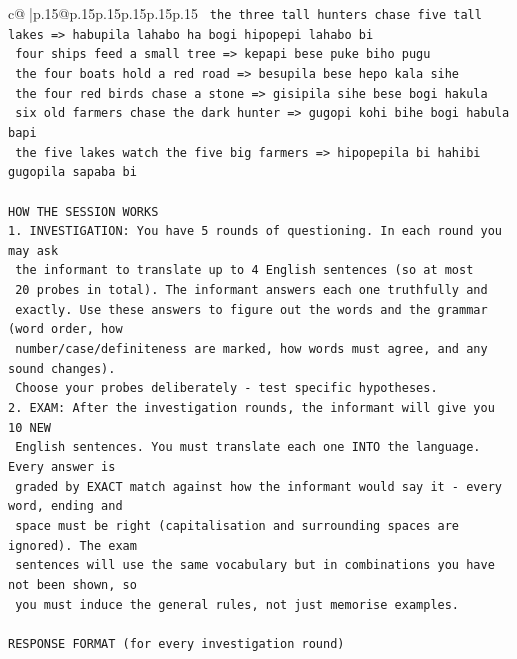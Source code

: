\documentclass{article}
\begin{document}
{\begin{supertabular}{c@{$\;$}|p{.15\linewidth}@{}p{.15\linewidth}p{.15\linewidth}p{.15\linewidth}p{.15\linewidth}p{.15\linewidth}}
{{{\texttt{    the three tall hunters chase five tall lakes  =>  habupila lahabo ha bogi hipopepi lahabo bi} \\
\texttt{    four ships feed a small tree  =>  kepapi bese puke biho pugu} \\
\texttt{    the four boats hold a red road  =>  besupila bese hepo kala sihe} \\
\texttt{    the four red birds chase a stone  =>  gisipila sihe bese bogi hakula} \\
\texttt{    six old farmers chase the dark hunter  =>  gugopi kohi bihe bogi habula bapi} \\
\texttt{    the five lakes watch the five big farmers  =>  hipopepila bi hahibi gugopila sapaba bi} \\
\\ 
\texttt{HOW THE SESSION WORKS} \\
\texttt{1. INVESTIGATION: You have 5 rounds of questioning. In each round you may ask} \\
\texttt{   the informant to translate up to 4 English sentences (so at most} \\
\texttt{   20 probes in total). The informant answers each one truthfully and} \\
\texttt{   exactly. Use these answers to figure out the words and the grammar (word order, how} \\
\texttt{   number/case/definiteness are marked, how words must agree, and any sound changes).} \\
\texttt{   Choose your probes deliberately {-} test specific hypotheses.} \\
\texttt{2. EXAM: After the investigation rounds, the informant will give you 10 NEW} \\
\texttt{   English sentences. You must translate each one INTO the language. Every answer is} \\
\texttt{   graded by EXACT match against how the informant would say it {-} every word, ending and} \\
\texttt{   space must be right (capitalisation and surrounding spaces are ignored). The exam} \\
\texttt{   sentences will use the same vocabulary but in combinations you have not been shown, so} \\
\texttt{   you must induce the general rules, not just memorise examples.} \\
\\ 
\texttt{RESPONSE FORMAT (for every investigation round)} \\
}}}
\end{supertabular}}
\end{document}
